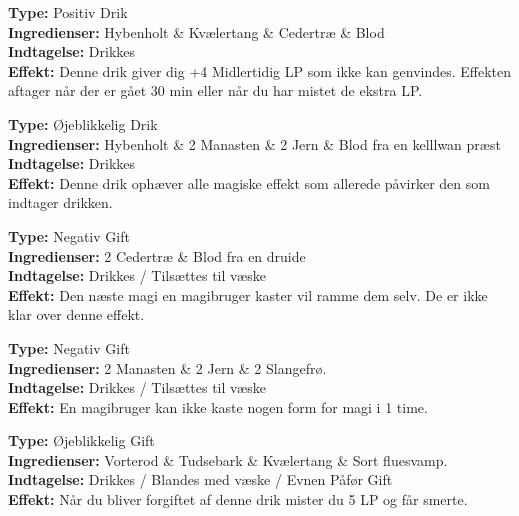 \begin{drik*}[Jernhud]
\textbf{Type:} Positiv Drik\\
\textbf{Ingredienser:} Hybenholt \& Kvælertang \& Cedertræ \& Blod\\
\textbf{Indtagelse:} Drikkes\\
\textbf{Effekt:} Denne drik giver dig +4 Midlertidig LP som ikke kan genvindes. Effekten aftager når der er gået 30 min eller når du har mistet de ekstra LP.\\
\end{drik*}

\begin{drik*}
\textbf{Type:} Øjeblikkelig Drik\\
\textbf{Ingredienser:} Hybenholt \& 2 Manasten \& 2 Jern \& Blod fra en kelllwan præst\\
\textbf{Indtagelse:} Drikkes\\
\textbf{Effekt:} Denne drik ophæver alle magiske effekt som allerede påvirker den som indtager drikken.\\
\end{drik*}

\begin{gift*}
\textbf{Type:} Negativ Gift\\
\textbf{Ingredienser:} 2 Cedertræ \& Blod fra en druide\\
\textbf{Indtagelse:} Drikkes / Tilsættes til væske\\
\textbf{Effekt:} Den næste magi en magibruger kaster vil ramme dem selv. De er ikke klar over denne effekt.\\
\end{gift*}

\begin{gift*}
\textbf{Type:} Negativ Gift\\
\textbf{Ingredienser:} 2 Manasten \& 2 Jern \& 2 Slangefrø.\\
\textbf{Indtagelse:} Drikkes / Tilsættes til væske\\
\textbf{Effekt:} En magibruger kan ikke kaste nogen form for magi i 1 time.\\
\end{gift*}

\begin{gift*}
\textbf{Type:} Øjeblikkelig Gift\\
\textbf{Ingredienser:} Vorterod \& Tudsebark \& Kvælertang \& Sort fluesvamp.\\
\textbf{Indtagelse:} Drikkes / Blandes med væske / Evnen Påfør Gift\\
\textbf{Effekt:} Når du bliver forgiftet af denne drik mister du 5 LP og får smerte.\\
\end{gift*}

